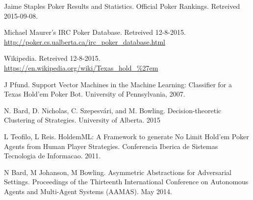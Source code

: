 \documentclass[twoside]{article}
\begin{document}
\begin{multicols}{2}
\begin{thebibliography}{99}
 Jaime Staples Poker Results and Statistics. Official Poker Rankings. Retreived 2015-09-08.

 Michael Maurer's IRC Poker Database. Retreived 12-8-2015.
\url{http://poker.cs.ualberta.ca/irc_poker_database.html}

 Wikipedia. Retreived 12-8-2015.
\url{https://en.wikipedia.org/wiki/Texas_hold_%27em}

 J Pfund. Support Vector Machines in the Machine Learning: Classifier for a Texas Hold'em Poker Bot.  University of Pennsylvania, 2007.

 N. Bard, D. Nicholas, C. Szepesvári, and M. Bowling. Decision-theoretic Clustering of Strategies. University of Alberta. 2015

 L Teofilo, L Reis. HoldemML: A Framework to generate No Limit Hold’em Poker Agents from Human Player Strategies. Conferencia Iberica de Sistemas Tecnologia de Informacao. 2011.

 N Bard, M Johanson, M Bowling. Asymmetric Abstractions for Adversarial Settings. Proceedings of the Thirteenth International Conference on Autonomous Agents and Multi-Agent Systems (AAMAS). May 2014.
\end{thebibliography}


\end{multicols}
\end{document}
